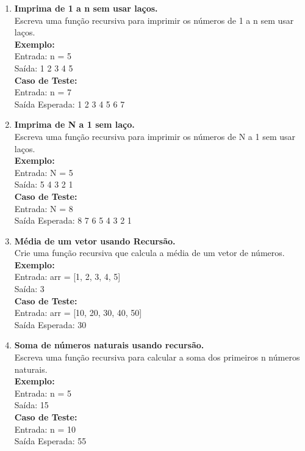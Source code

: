 \documentclass[12pt]{article}
\begin{document}
\begin{enumerate}

    \item \textbf{Imprima de 1 a n sem usar laços.} \\
    Escreva uma função recursiva para imprimir os números de 1 a n sem usar laços. \\
    \textbf{Exemplo:} \\
    Entrada: n = 5 \\
    Saída: 1 2 3 4 5 \\
    \textbf{Caso de Teste:} \\
    Entrada: n = 7 \\
    Saída Esperada: 1 2 3 4 5 6 7
    
    \item \textbf{Imprima de N a 1 sem laço.} \\
    Escreva uma função recursiva para imprimir os números de N a 1 sem usar laços. \\
    \textbf{Exemplo:} \\
    Entrada: N = 5 \\
    Saída: 5 4 3 2 1 \\
    \textbf{Caso de Teste:} \\
    Entrada: N = 8 \\
    Saída Esperada: 8 7 6 5 4 3 2 1
    
    \item \textbf{Média de um vetor usando Recursão.} \\
    Crie uma função recursiva que calcula a média de um vetor de números. \\
    \textbf{Exemplo:} \\
    Entrada: arr = [1, 2, 3, 4, 5] \\
    Saída: 3 \\
    \textbf{Caso de Teste:} \\
    Entrada: arr = [10, 20, 30, 40, 50] \\
    Saída Esperada: 30
    
    \item \textbf{Soma de números naturais usando recursão.} \\
    Escreva uma função recursiva para calcular a soma dos primeiros n números naturais. \\
    \textbf{Exemplo:} \\
    Entrada: n = 5 \\
    Saída: 15 \\
    \textbf{Caso de Teste:} \\
    Entrada: n = 10 \\
    Saída Esperada: 55
    

\end{enumerate}
\end{document}
